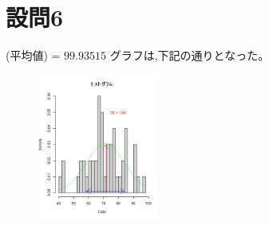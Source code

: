 \documentclass[fontsize = 10pt, paper= a4,twocolumn,column_gap=5zw]{jlreq}
\begin{document}
\section{設問6}
(平均値) = $99.93515$
グラフは,下記の通りとなった。
\begin{figure}
    \centering
    \includegraphics[width=4cm]{kadai5.png}
\end{figure}
\end{document}

